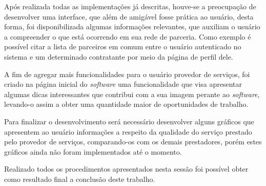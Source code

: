 \par Após realizada todas as implementações já descritas, houve-se a preocupação de desenvolver uma interface, que além de amigável fosse prática ao usuário, desta forma, foi disponibilizada algumas informações relevantes, que auxiliam o usuário a compreender o que está ocorrendo em sua rede de parceria. Como exemplo é possível citar a lista de parceiros em comum entre o usuário autenticado no sistema e um determinado contratante por meio da página de perfil dele.

\par A fim de agregar mais funcionalidades para o usuário provedor de serviços, foi criado na página inicial do \textit{software} uma funcionalidade que visa apresentar algumas dicas interessantes que contribui com a sua imagem perante ao \textit{software}, levando-o assim a obter uma quantidade maior de oportunidades de trabalho.

\par Para finalizar o desenvolvimento será necessário desenvolver alguns gráficos que apresentem ao usuário informações a respeito da qualidade do serviço prestado pelo provedor de serviços, comparando-os com os demais prestadores, porém estes gráficos ainda não foram implementados até o momento.

\par Realizado todos os procedimentos apresentados nesta sessão foi possível obter como resultado final a conclusão deste trabalho.